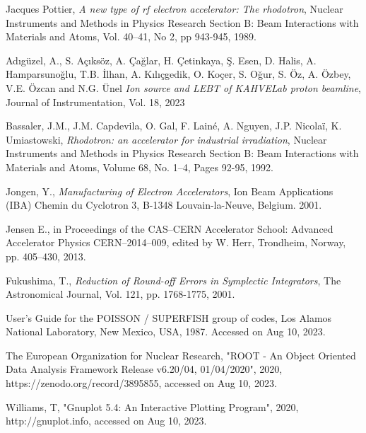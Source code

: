 \documentclass[a4paper,oneside,12pt]{report}
\numberwithin{equation}{chapter}
\begin{document}
{%

\begin{thebibliography}{9}

    Jacques Pottier,
    \emph{A new type of rf electron accelerator: The rhodotron},
    Nuclear Instruments and Methods in Physics Research Section B: Beam Interactions with Materials and Atoms,
    Vol. 40–41,
    No 2,
    pp 943-945,
    1989.

    Adıgüzel, A., S. Açıksöz, A. Çağlar, H. Çetinkaya, Ş. Esen, D. Halis, A. Hamparsunoğlu, T.B. İlhan, A. Kılıçgedik, O. Koçer, S. Oğur, S. Öz, A. Özbey, V.E. Özcan and N.G. Ünel
    \emph{Ion source and LEBT of KAHVELab proton beamline},
    Journal of Instrumentation,
    Vol. 18,
    2023

    Bassaler, J.M., J.M. Capdevila, O. Gal, F. Lainé, A. Nguyen, J.P. Nicolaï, K. Umiastowski,
    \emph{Rhodotron: an accelerator for industrial irradiation},
    Nuclear Instruments and Methods in Physics Research Section B: Beam Interactions with Materials and Atoms,
    Volume 68, No. 1–4,
    Pages 92-95,
    1992.

    Jongen, Y.,
    \emph{Manufacturing of Electron Accelerators},
    Ion Beam Applications (IBA) Chemin du Cyclotron 3,
    B-1348 Louvain-la-Neuve, Belgium.
    2001.

    Jensen E., in Proceedings of the CAS–CERN Accelerator School: Advanced Accelerator Physics CERN–2014–009,
    edited by W. Herr, Trondheim, Norway,
    pp. 405–430,
    2013.

    Fukushima, T., 
    \emph{Reduction of Round-off Errors in Symplectic Integrators},
    The Astronomical Journal,
    Vol. 121,
    pp. 1768-1775,
    2001.

    User's Guide for the POISSON / SUPERFISH group of codes, 
    Los Alamos National Laboratory, New Mexico, USA, 1987. Accessed on Aug 10, 2023. 
    
    The European Organization for Nuclear Research, 
    "ROOT - An Object Oriented Data Analysis Framework Release v6.20/04, 01/04/2020", 2020,
    https://zenodo.org/record/3895855, accessed on Aug 10, 2023.

    Williams, T, "Gnuplot 5.4: An Interactive
    Plotting Program", 2020, http://gnuplot.info, accessed on Aug 10, 2023.


\end{thebibliography}}
\end{document}
